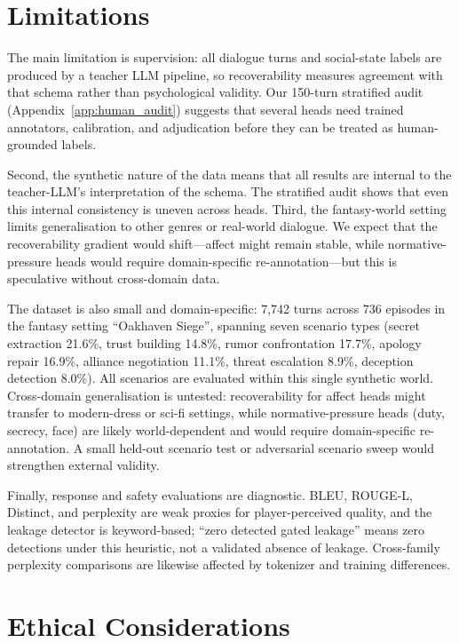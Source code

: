 \documentclass[11pt]{article}
\begin{document}
\section*{Limitations}
\label{sec:limitations}

The main limitation is supervision: all dialogue turns and social-state labels are produced by a teacher LLM pipeline, so recoverability measures agreement with that schema rather than psychological validity. Our 150-turn stratified audit (Appendix~\ref{app:human_audit}) suggests that several heads need trained annotators, calibration, and adjudication before they can be treated as human-grounded labels.

Second, the synthetic nature of the data means that all results are internal to the teacher-LLM's interpretation of the schema. The stratified audit shows that even this internal consistency is uneven across heads. Third, the fantasy-world setting limits generalisation to other genres or real-world dialogue. We expect that the recoverability gradient would shift---affect might remain stable, while normative-pressure heads would require domain-specific re-annotation---but this is speculative without cross-domain data.

The dataset is also small and domain-specific: 7,742 turns across 736 episodes in the fantasy setting ``Oakhaven Siege'', spanning seven scenario types (secret extraction 21.6\%, trust building 14.8\%, rumor confrontation 17.7\%, apology repair 16.9\%, alliance negotiation 11.1\%, threat escalation 8.9\%, deception detection 8.0\%). All scenarios are evaluated within this single synthetic world. Cross-domain generalisation is untested: recoverability for affect heads might transfer to modern-dress or sci-fi settings, while normative-pressure heads (duty, secrecy, face) are likely world-dependent and would require domain-specific re-annotation. A small held-out scenario test or adversarial scenario sweep would strengthen external validity.

Finally, response and safety evaluations are diagnostic. BLEU, ROUGE-L, Distinct, and perplexity are weak proxies for player-perceived quality, and the leakage detector is keyword-based; ``zero detected gated leakage'' means zero detections under this heuristic, not a validated absence of leakage. Cross-family perplexity comparisons are likewise affected by tokenizer and training differences.

\section*{Ethical Considerations}
\end{document}
